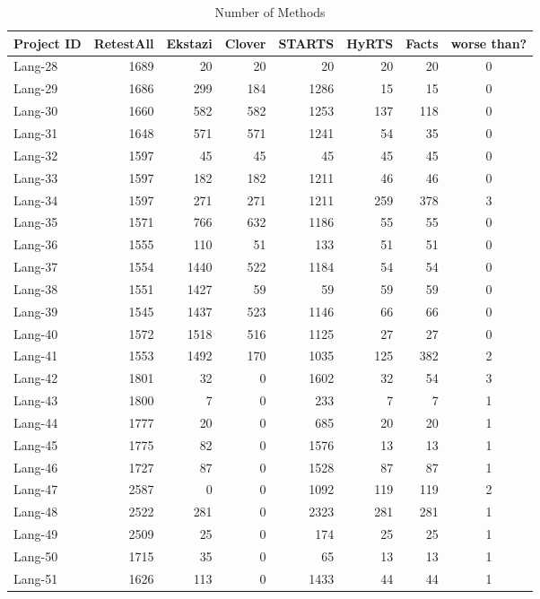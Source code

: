 \begin{footnotesize}
\centering
\begin{longtable}{lrrrrrrc}
\caption{Number of Methods}
\label{tab:rts-methods-num}\\ \toprule
\textbf{Project ID}  & \textbf{RetestAll} & \textbf{Ekstazi} & \textbf{Clover} & \textbf{STARTS} & \textbf{HyRTS} & \textbf{Facts}  & \textbf{worse than?} \\ \midrule
Lang-28 &  1689 & 20 & 20 & 20 & 20  & 20 & 0\\
Lang-29 &  1686 & 299 & 184 & 1286 & 15  & 15 & 0\\
Lang-30 &  1660 & 582 & 582 & 1253 & 137  & 118 & 0\\
Lang-31 &  1648 & 571 & 571 & 1241 & 54  & 35 & 0\\
Lang-32 &  1597 & 45 & 45 & 45 & 45  & 45 & 0\\
Lang-33 &  1597 & 182 & 182 & 1211 & 46  & 46 & 0\\
Lang-34 &  1597 & 271 & 271 & 1211 & 259  & 378 & 3\\
Lang-35 &  1571 & 766 & 632 & 1186 & 55  & 55 & 0\\
Lang-36 &  1555 & 110 & 51 & 133 & 51  & 51 & 0\\
Lang-37 &  1554 & 1440 & 522 & 1184 & 54  & 54 & 0\\
Lang-38 &  1551 & 1427 & 59 & 59 & 59  & 59 & 0\\
Lang-39 &  1545 & 1437 & 523 & 1146 & 66  & 66 & 0\\
Lang-40 &  1572 & 1518 & 516 & 1125 & 27  & 27 & 0\\
Lang-41 &  1553 & 1492 & 170 & 1035 & 125  & 382 & 2\\
Lang-42 &  1801 & 32 & 0 & 1602 & 32  & 54 & 3\\
Lang-43 &  1800 & 7 & 0 & 233 & 7  & 7 & 1\\
Lang-44 &  1777 & 20 & 0 & 685 & 20  & 20 & 1\\
Lang-45 &  1775 & 82 & 0 & 1576 & 13  & 13 & 1\\
Lang-46 &  1727 & 87 & 0 & 1528 & 87  & 87 & 1\\
Lang-47 &  2587 & 0 & 0 & 1092 & 119  & 119 & 2\\
Lang-48 &  2522 & 281 & 0 & 2323 & 281  & 281 & 1\\
Lang-49 &  2509 & 25 & 0 & 174 & 25  & 25 & 1\\
Lang-50 &  1715 & 35 & 0 & 65 & 13  & 13 & 1\\
Lang-51 &  1626 & 113 & 0 & 1433 & 44  & 44 & 1\\

\end{longtable}
\end{footnotesize}
